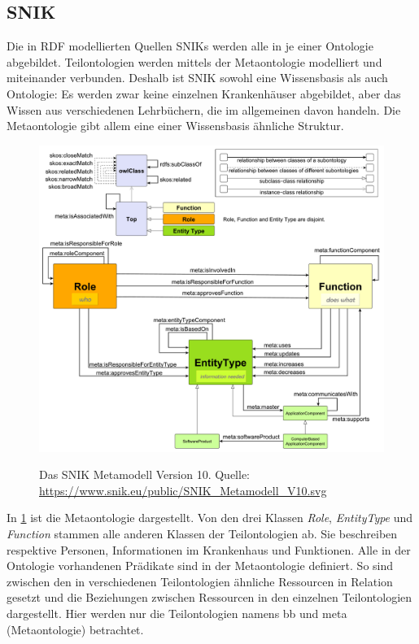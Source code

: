 \documentclass[utf8,biblatex]{lni}
\begin{document}
\subsection{SNIK}

Die in RDF modellierten Quellen SNIKs werden alle in je einer Ontologie abgebildet.
Teilontologien werden mittels der Metaontologie modelliert und miteinander verbunden.
Deshalb ist SNIK sowohl eine Wissensbasis als auch Ontologie:
Es werden zwar keine einzelnen Krankenhäuser abgebildet, aber das Wissen aus verschiedenen Lehrbüchern, die im allgemeinen davon handeln.
Die Metaontologie gibt allem eine einer Wissensbasis ähnliche Struktur.

\begin{figure}[h]
  \includegraphics[width=\linewidth]{../Dokumentation/Images/snik-metamodel-V10.pdf}\label{fig:snik-metamodel}
  \caption[SNIK Metamodell Version 10]{Das SNIK Metamodell Version 10. Quelle: \url{https://www.snik.eu/public/SNIK_Metamodell_V10.svg}}
\end{figure}
In \cref{fig:snik-metamodel} ist die Metaontologie dargestellt.
Von den drei Klassen \emph{Role}, \emph{EntityType} und \emph{Function} stammen alle anderen Klassen der Teilontologien ab.
Sie beschreiben respektive Personen, Informationen im Krankenhaus und Funktionen.
Alle in der Ontologie vorhandenen Prädikate sind in der Metaontologie definiert.
So sind zwischen den in verschiedenen Teilontologien ähnliche Ressourcen in Relation gesetzt und die Beziehungen zwischen Ressourcen in den einzelnen Teilontologien dargestellt.
Hier werden nur die Teilontologien namens bb \cite{bb} und meta (Metaontologie) betrachtet.
\end{document}
